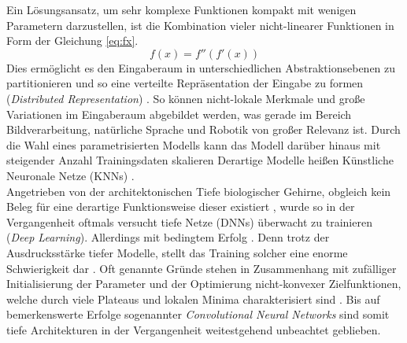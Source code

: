 Ein Lösungsansatz, um sehr komplexe Funktionen kompakt mit wenigen Parametern darzustellen, ist die Kombination vieler nicht-linearer Funktionen in Form der Gleichung \ref{eq:fx}.
\begin{equation}
\label{eq:fx}
f(x) = f''(f'(x))
\end{equation}
Dies ermöglicht es den Eingaberaum in unterschiedlichen Abstraktionsebenen zu partitionieren und so eine verteilte Repräsentation der Eingabe zu formen (\textit{Distributed Representation}) \cite[vgl.][]{Rumelhart1986b}. So können nicht-lokale Merkmale und große Variationen im Eingaberaum abgebildet werden, was gerade im Bereich Bildverarbeitung, natürliche Sprache und Robotik von großer Relevanz ist. Durch die Wahl eines parametrisierten Modells kann das Modell darüber hinaus mit steigender Anzahl Trainingsdaten skalieren \textemdash Derartige Modelle heißen Künstliche Neuronale Netze (KNNs) \cite[vgl.][]{McCulloch1943}.\\
Angetrieben von der architektonischen Tiefe biologischer Gehirne, obgleich kein Beleg für eine derartige Funktionsweise dieser existiert \cite[vgl.][]{Becker1991}, wurde so in der Vergangenheit oftmals versucht tiefe Netze (DNNs) überwacht zu trainieren (\textit{Deep Learning}). Allerdings mit bedingtem Erfolg \cite[vgl.][]{Bengio2007b}. Denn trotz der Ausdrucksstärke tiefer Modelle, stellt das Training solcher eine enorme Schwierigkeit dar \cite[vgl.][]{Becker1991}. Oft genannte Gründe stehen in Zusammenhang mit zufälliger Initialisierung der Parameter und der Optimierung nicht-konvexer Zielfunktionen, welche durch viele Plateaus und lokalen Minima charakterisiert sind \cite[vgl.][]{Bengio2009}.
Bis auf bemerkenswerte Erfolge sogenannter \textit{Convolutional Neural Networks} \cite[vgl.][]{LeCun1989} sind somit tiefe Architekturen in der Vergangenheit weitestgehend unbeachtet geblieben.

